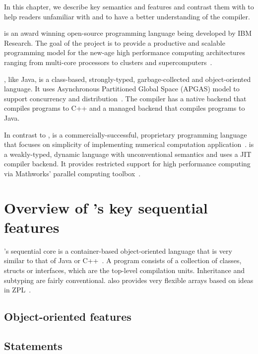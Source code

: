 
In this chapter, we describe key \xten semantics and features and contrast 
them with \matlab to help readers unfamiliar with \xten and \matlab to
have a better understanding of the \mixten compiler.   

\xten is an award winning open-source programming language being developed by
IBM Research. The goal of the \xten project is to provide a productive and
scalable programming model for the new-age high performance computing
architectures ranging from multi-core processors to clusters and
supercomputers~\cite{}. 

\xten, like Java, is a class-based, strongly-typed, garbage-collected and
object-oriented language. It uses Asynchronous Partitioned Global Space (APGAS)
model to support concurrency and distribution~\cite{}. The \xten compiler has a
native backend that compiles \xten programs to C++ and a managed backend that
compiles \xten programs to Java. 

In contrast to \xten, \matlab is a commercially-successful, proprietary
programming language that focuses on simplicity of implementing numerical
computation application~\cite{}. \matlab is a weakly-typed, dynamic language
with unconventional semantics and uses a JIT compiler backend.
It provides restricted support for high performance
computing via Mathworks' parallel computing toolbox~\cite{}. 

\section{Overview of \xten's key sequential features}

\xten's sequential core is a container-based object-oriented language that is 
very similar to that of Java or C++~\cite{}. A \xten program consists of a
collection of classes, structs or interfaces, which are the top-level compilation
units. Inheritance and subtyping are fairly conventional. \xten also provides very flexible
arrays based on ideas in ZPL~\cite{}.  
\subsection{Object-oriented features}

\subsection{Statements}

